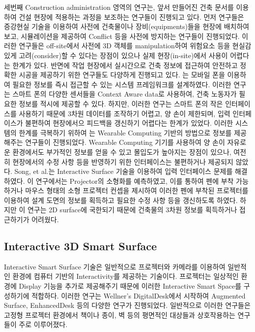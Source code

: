 세번째 Construction administration 영역의 연구는, 앞서 만들어진 건축 문서를 이용하여 건설 현장에 적용하는 과정을 보조하는 연구들이 진행되고 있다. 먼저 \cite{behzadan_enabling_2013, kim_interactive_2012} 연구들은 증강현실 기술을 이용하여 사전에 건축물이나 장비(equipments)들을 현장에 배치하여보고, 시뮬레이션을 제공하여 Conflict 등을 사전에 방지하는 연구들이 진행되었다. 이러한 연구들은 off-site에서 사전에 3D 객체를 manipulation하여 위험요소 등을 현실감 있게 고려(consider)할 수 있다는 장점이 있으나 실제 현장(in-site)에서 사용이 어렵다는 한계가 있다. 반면에 작업 현장에서 실시간으로 건축 정보에 접근하여 안전하고 정확한 시공을 제공하기 위한 연구들도 다양하게 진행되고 있다. \cite{aziz_supporting_2012, chen_framework_2011, giretti_design_2009}는 모바일 폰을 이용하여 필요한 정보를 즉시 접근할 수 있는 시스템 프레임워크를 설계하였다. 이러한 연구는 스마트 폰의 다양한 센서들을 Context Aware data로 사용하여, 건축 노동자가 필요한 정보를 적시에 제공할 수 있다. 하지만, 이러한 연구는 스마트 폰의 작은 인터페이스를 사용하기 때문에 3차원 데이터를 조작하기 어렵고, 양 손이 제한되며, 입력 인터페이스가 불편하여 현장에서으 피드백을 갱신하기 어렵다는 한계가 있었다. 이러한 시스템의 한계를 극복하기 위하여 \cite{behzadan_visualization_2005, khoury_high-precision_2009, yeh_-site_2012}는 Wearable Computing 기반의 방법으로 정보를 제공해주는 연구들이 진행되었다. Wearable Computing 기기를 사용하여 양 손이 자유로운 환경에서도 부가적인 정보를 얻을 수 있고 몰입도가 높아지는 장점이 있으나, 여전히 현장에서의 수정 사항 등을 반영하기 위한 인터페이스는 불편하거나 제공되지 않았다. Song, et al.\cite{song_penlight:_2009, song_mouselight:_2010}는 Interactive Surface 기술을 이용하여 입력 인터페이스 문제를 해결하였다. 이 연구에서는 Projector의 소형화를 예측하였고, 이를 통하여 펜에 부착 가능하거나 마우스 형태의 소형 프로젝터 컨셉을 제시하여 이러한 펜에 부착된 프로젝터를 이용하여 설계 도면의 정보를 획득하고 필요한 수정 사항 등을 갱신하도록 하였다. 하지만 이 연구는 2D surface에 국한되기 때문에 건축물의 3차원 정보를 획득하거나 접근하기가 어려웠다. 

\subsection{Interactive 3D Smart Surface}
Interactive Smart Surface 기술은 일반적으로 프로젝터와 카메라를 이용하여 일반적인 환경에 컴퓨터 기반의 Interactivity를 제공하는 기술이다\cite{kane_bonfire:_2009}. 프로젝터는 일상적인 환경에 Display 기능을 추가로 제공해주기 때문에 이러한 Interactive Smart Space를 구성하기에 적합하다. 이러한 연구는 Wellner's DigitalDesk\cite{wellner_digitaldesk_1991, wellner_interacting_1993}에서 시작하여 Augmented Surface\cite{rekimoto_augmented_1999}, EnhancedDesk\cite{koike_integrating_2001} 등의 다양한 연구가 진행되었다. 일반적으로 이러한 연구들은 고정형 프로젝터 환경에서 책이나 종이, 벽 등의 평면적인 대상들과 상호작용하는 연구들이 주로 이루어졌다. 

